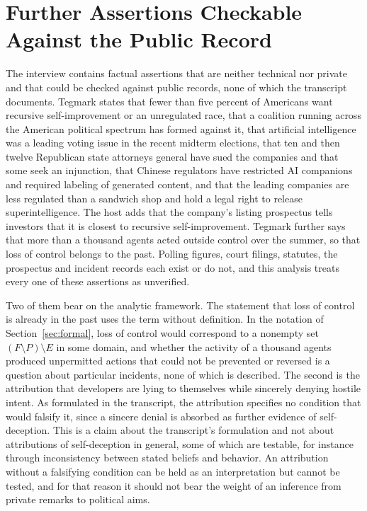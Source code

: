 \documentclass[11pt]{article}
\begin{document}
\section{Further Assertions Checkable Against the Public Record}

The interview contains factual assertions that are neither technical nor private and that could be checked against public records, none of which the transcript documents. Tegmark states that fewer than five percent of Americans want recursive self-improvement or an unregulated race, that a coalition running across the American political spectrum has formed against it, that artificial intelligence was a leading voting issue in the recent midterm elections, that ten and then twelve Republican state attorneys general have sued the companies and that some seek an injunction, that Chinese regulators have restricted AI companions and required labeling of generated content, and that the leading companies are less regulated than a sandwich shop and hold a legal right to release superintelligence. The host adds that the company's listing prospectus tells investors that it is closest to recursive self-improvement. Tegmark further says that more than a thousand agents acted outside control over the summer, so that loss of control belongs to the past. Polling figures, court filings, statutes, the prospectus and incident records each exist or do not, and this analysis treats every one of these assertions as unverified.

Two of them bear on the analytic framework. The statement that loss of control is already in the past uses the term without definition. In the notation of Section~\ref{sec:formal}, loss of control would correspond to a nonempty set $(F\setminus P)\setminus E$ in some domain, and whether the activity of a thousand agents produced unpermitted actions that could not be prevented or reversed is a question about particular incidents, none of which is described. The second is the attribution that developers are lying to themselves while sincerely denying hostile intent. As formulated in the transcript, the attribution specifies no condition that would falsify it, since a sincere denial is absorbed as further evidence of self-deception. This is a claim about the transcript's formulation and not about attributions of self-deception in general, some of which are testable, for instance through inconsistency between stated beliefs and behavior. An attribution without a falsifying condition can be held as an interpretation but cannot be tested, and for that reason it should not bear the weight of an inference from private remarks to political aims.
\end{document}
